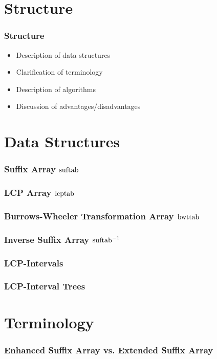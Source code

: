 \documentclass[compress,handout]{beamer} %
\begin{document}
\section{Structure}

\begin{frame}
	\frametitle{Structure}
	\begin{itemize}
		\item Description of data structures
		\item Clarification of terminology
		\item Description of algorithms
		\item Discussion of advantages/disadvantages
	\end{itemize}
\end{frame}

\section{Data Structures}

\begin{frame}
	\frametitle{Suffix Array $\hbox{suftab}$}
\end{frame}

\begin{frame}
	\frametitle{LCP Array $\hbox{lcptab}$}
\end{frame}

\begin{frame}
	\frametitle{Burrows-Wheeler Transformation Array $\hbox{bwttab}$}
\end{frame}

\begin{frame}
	\frametitle{Inverse Suffix Array $\hbox{suftab}^{-1}$}
\end{frame}

\begin{frame}
	\frametitle{LCP-Intervals}
\end{frame}

\begin{frame}
	\frametitle{LCP-Interval Trees}
\end{frame}

\section{Terminology}

\begin{frame}
	\frametitle{Enhanced Suffix Array vs. Extended Suffix Array}
\end{frame}
\end{document}
